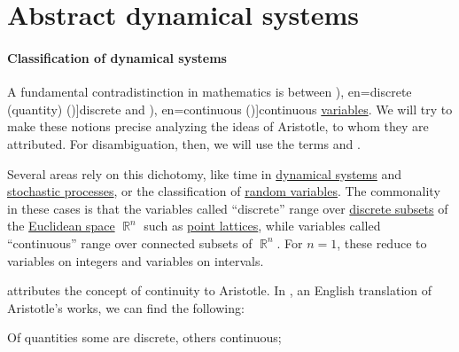 \section{Abstract dynamical systems}\label{sec:abstract_dynamical_systems}

\paragraph{Classification of dynamical systems}

\begin{concept}\label{con:discrete_and_continuous_variables}
  A fundamental contradistinction in mathematics is between \term[ru=дискретная (величина) (\cite[16]{Розенфельд1963ОсновныеПонятиеГеометрии}), en=discrete (quantity) ({\cite[36]{Aristotle1984Categories})}]{discrete} and \term[ru=непрерывная (величина) (\cite[16]{Розенфельд1963ОсновныеПонятиеГеометрии}), en=continuous ({\cite[36]{Aristotle1984Categories}})]{continuous} \hyperref[con:variable]{variables}. We will try to make these notions precise analyzing the ideas of Aristotle, to whom they are attributed. For disambiguation, then, we will use the terms  and .

  Several areas rely on this dichotomy, like time in \hyperref[def:dynamical_system]{dynamical systems} and \hyperref[def:stochastic_process]{stochastic processes}, or the classification of \hyperref[def:random_variable]{random variables}. The commonality in these cases is that the variables called \enquote{discrete} range over \hyperref[def:discrete_set]{discrete subsets} of the \hyperref[def:euclidean_plane]{Euclidean space} \( \BbbR^n \) such as \hyperref[def:point_lattice]{point lattices}, while variables called \enquote{continuous} range over connected subsets of \( \BbbR^n \). For \( n = 1 \), these reduce to variables on integers and variables on intervals.

   attributes the concept of continuity to Aristotle. In \cite[36]{Aristotle1984Categories}, an English translation of Aristotle's works, we can find the following:
  \begin{displayquote}
    Of quantities some are discrete, others continuous; \textellipsis


\end{displayquote}
\end{concept}

